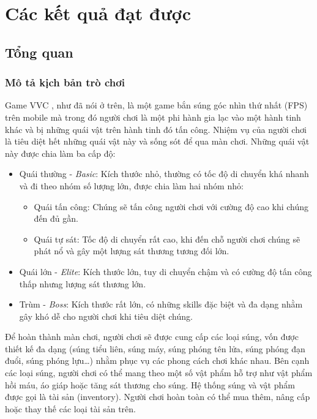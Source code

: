 \documentclass[12pt]{report}
\newcommand{\project}{VVC }
\begin{document}
\stopcontents[parts]

\part{Các kết quả đạt được}
\startcontents[parts]
\chapter{Tổng quan}
\section{Mô tả kịch bản trò chơi}
Game \project, như đã nói ở trên, là một game bắn súng góc nhìn thứ nhất (FPS) trên mobile mà trong đó người chơi là một phi hành gia lạc vào một hành tinh khác và bị những quái vật trên hành tinh đó tấn công. Nhiệm vụ của người chơi là tiêu diệt hết những quái vật này và sống sót để qua màn chơi. Những quái vật này được chia làm ba cấp độ:
\begin{itemize}
	\item Quái thường - \textit{Basic}: Kích thước nhỏ, thường có tốc độ di chuyển khá nhanh và đi theo nhóm số lượng lớn, được chia làm hai nhóm nhỏ:
	\begin{itemize}
		\item Quái tấn công: Chúng sẽ tấn công người chơi với cường độ cao khi chúng đến đủ gần.
		\item Quái tự sát: Tốc độ di chuyển rất cao, khi đến chỗ người chơi chúng sẽ phát nổ và gây một lượng sát thương tương đối lớn.
	\end{itemize}
	\item Quái lớn - \textit{Elite}: Kích thước lớn, tuy di chuyển chậm và có cường độ tấn công thấp nhưng lượng sát thương lớn.
	\item Trùm - \textit{Boss}: Kích thước rất lớn, có những skills đặc biệt và đa dạng nhằm gây khó dễ cho người chơi khi tiêu diệt chúng.
\end{itemize}

Để hoàn thành màn chơi, người chơi sẽ được cung cấp các loại súng, vốn được thiết kế đa dạng (súng tiểu liên, súng máy, súng phóng tên lửa, súng phóng đạn đuổi, súng phóng lựu\ldots) nhằm phục vụ các phong cách chơi khác nhau. Bên cạnh các loại súng, người chơi có thể mang theo một số vật phẩm hỗ trợ như vật phẩm hồi máu, áo giáp hoặc tăng sát thương cho súng. Hệ thống súng và vật phẩm được gọi là tài sản (inventory). Người chơi hoàn toàn có thể mua thêm, nâng cấp hoặc thay thế các loại tài sản trên.
\end{document}
